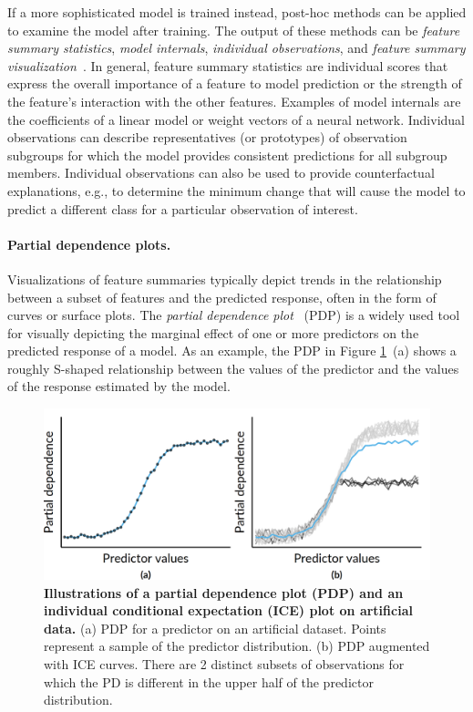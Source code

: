 \documentclass[
  oneside]{book}
\begin{document}
If a more sophisticated model is trained instead, post-hoc methods can be applied to examine the model after training.
The output of these methods can be \emph{feature summary statistics}, \emph{model internals}, \emph{individual observations}, and \emph{feature summary visualization}~\autocite{molnar2020interpretable}.
In general, feature summary statistics are individual scores that express the overall importance of a feature to model prediction or the strength of the feature's interaction with the other features.
Examples of model internals are the coefficients of a linear model or weight vectors of a neural network.
Individual observations can describe representatives (or prototypes) of observation subgroups for which the model provides consistent predictions for all subgroup members.
Individual observations can also be used to provide counterfactual explanations, e.g., to determine the minimum change that will cause the model to predict a different class for a particular observation of interest.

\paragraph*{Partial dependence plots.}

Visualizations of feature summaries typically depict trends in the relationship between a subset of features and the predicted response, often in the form of curves or surface plots.
The \emph{partial dependence plot}~\autocite{Friedman:PDP2001} (PDP) is a widely used tool for visually depicting the marginal effect of one or more predictors on the predicted response of a model.
As an example, the PDP in Figure \ref{fig:09-pd-intro}~(a) shows a roughly S-shaped relationship between the values of the predictor and the values of the response estimated by the model.



\begin{figure}[htbp]

{\centering \includegraphics[width=0.64\linewidth]{figures/09-pd-intro} 

}

\caption{\textbf{Illustrations of a partial dependence plot (PDP) and an individual conditional expectation (ICE) plot on artificial data.} (a) PDP for a predictor on an artificial dataset. Points represent a sample of the predictor distribution. (b) PDP augmented with ICE curves. There are 2 distinct subsets of observations for which the PD is different in the upper half of the predictor distribution.}\label{fig:09-pd-intro}
\end{figure}
\end{document}
